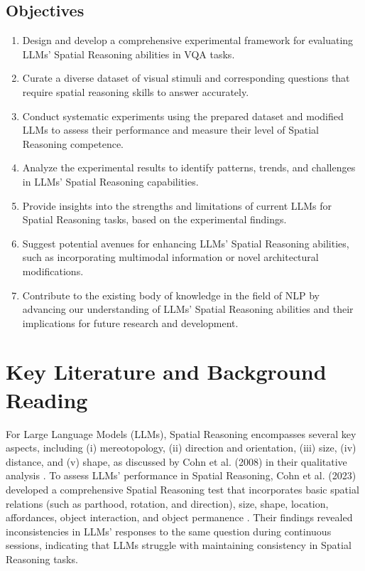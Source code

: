 \documentclass[journal,10pt]{IEEEtran}
\begin{document}
\subsection{Objectives}
\begin{enumerate}
    \item Design and develop a comprehensive experimental framework for evaluating LLMs' Spatial Reasoning abilities in VQA tasks.
    \item Curate a diverse dataset of visual stimuli and corresponding questions that require spatial reasoning skills to answer accurately.
    \item Conduct systematic experiments using the prepared dataset and modified LLMs to assess their performance and measure their level of Spatial Reasoning competence.
    \item Analyze the experimental results to identify patterns, trends, and challenges in LLMs' Spatial Reasoning capabilities.
    \item Provide insights into the strengths and limitations of current LLMs for Spatial Reasoning tasks, based on the experimental findings.
    \item Suggest potential avenues for enhancing LLMs' Spatial Reasoning abilities, such as incorporating multimodal information or novel architectural modifications.
    \item Contribute to the existing body of knowledge in the field of NLP by advancing our understanding of LLMs' Spatial Reasoning abilities and their implications for future research and development.
\end{enumerate}

\section{Key Literature and Background Reading}
For Large Language Models (LLMs), Spatial Reasoning encompasses several key aspects, including (i) mereotopology, (ii) direction and orientation, (iii) size, (iv) distance, and (v) shape, as discussed by Cohn et al. (2008) in their qualitative analysis \cite{cohn2008qualitative}. To assess LLMs' performance in Spatial Reasoning, Cohn et al. (2023) developed a comprehensive Spatial Reasoning test that incorporates basic spatial relations (such as parthood, rotation, and direction), size, shape, location, affordances, object interaction, and object permanence \cite{cohn2023dialectical}. Their findings revealed inconsistencies in LLMs' responses to the same question during continuous sessions, indicating that LLMs struggle with maintaining consistency in Spatial Reasoning tasks.
\end{document}
